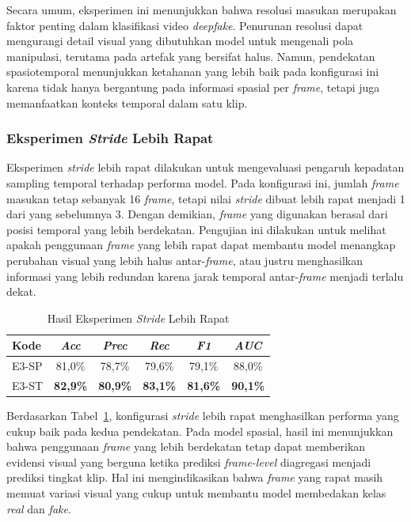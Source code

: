 Secara umum, eksperimen ini menunjukkan bahwa resolusi masukan merupakan faktor penting dalam klasifikasi video \textit{deepfake}. Penurunan resolusi dapat mengurangi detail visual yang dibutuhkan model untuk mengenali pola manipulasi, terutama pada artefak yang bersifat halus. Namun, pendekatan spasiotemporal menunjukkan ketahanan yang lebih baik pada konfigurasi ini karena tidak hanya bergantung pada informasi spasial per \textit{frame}, tetapi juga memanfaatkan konteks temporal dalam satu klip.

\subsubsection{Eksperimen \textit{Stride} Lebih Rapat} \label{IV.Eksperimen_Utama_Stride}

Eksperimen \textit{stride} lebih rapat dilakukan untuk mengevaluasi pengaruh kepadatan sampling temporal terhadap performa model. Pada konfigurasi ini, jumlah \textit{frame} masukan tetap sebanyak 16 \textit{frame}, tetapi nilai \textit{stride} dibuat lebih rapat menjadi 1 dari yang sebelumnya 3. Dengan demikian, \textit{frame} yang digunakan berasal dari posisi temporal yang lebih berdekatan. Pengujian ini dilakukan untuk melihat apakah penggunaan \textit{frame} yang lebih rapat dapat membantu model menangkap perubahan visual yang lebih halus antar-\textit{frame}, atau justru menghasilkan informasi yang lebih redundan karena jarak temporal antar-\textit{frame} menjadi terlalu dekat.

\begin{table}[htbp]
\centering
\caption{Hasil Eksperimen \textit{Stride} Lebih Rapat}
\label{table:4.eksperimen-utama-stride}
\begin{tabular}{lccccc}
\toprule
\textbf{Kode} &
\textbf{\textit{Acc}} &
\textbf{\textit{Prec}} &
\textbf{\textit{Rec}} &
\textbf{\textit{F1}} &
\textbf{\textit{AUC}} \\
\midrule
E3-SP & 81,0\% & 78,7\% & 79,6\% & 79,1\% & 88,0\% \\
E3-ST & \textbf{82,9\%} & \textbf{80,9\%} & \textbf{83,1\%} & \textbf{81,6\%} & \textbf{90,1\%} \\
\bottomrule
\end{tabular}
\end{table}

Berdasarkan Tabel~\ref{table:4.eksperimen-utama-stride}, konfigurasi \textit{stride} lebih rapat menghasilkan performa yang cukup baik pada kedua pendekatan. Pada model spasial, hasil ini menunjukkan bahwa penggunaan \textit{frame} yang lebih berdekatan tetap dapat memberikan evidensi visual yang berguna ketika prediksi \textit{frame-level} diagregasi menjadi prediksi tingkat klip. Hal ini mengindikasikan bahwa \textit{frame} yang rapat masih memuat variasi visual yang cukup untuk membantu model membedakan kelas \textit{real} dan \textit{fake}.

